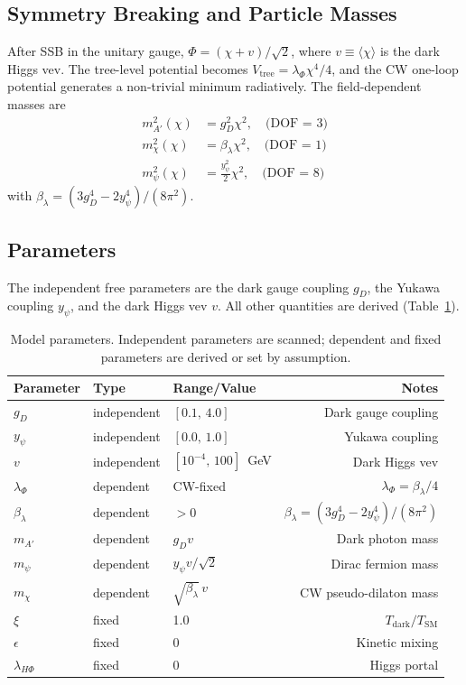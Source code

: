 \documentclass[12pt,a4paper]{article}
\begin{document}
\subsection{Symmetry Breaking and Particle Masses}

After SSB in the unitary gauge, $\Phi = (\chi + v)/\sqrt{2}$, where $v \equiv \langle\chi\rangle$ is the dark Higgs vev. The tree-level potential becomes $V_\text{tree} = \lambda_\Phi \chi^4 / 4$, and the CW one-loop potential generates a non-trivial minimum radiatively. The field-dependent masses are
\begin{align}
m_{A'}^2(\chi) &= g_D^2 \chi^2, \quad \text{(DOF = 3)} \label{eq:mA}\\
m_\chi^2(\chi) &= \beta_\lambda \chi^2, \quad \text{(DOF = 1)} \label{eq:mchi}\\
m_\psi^2(\chi) &= \frac{y_\psi^2}{2} \chi^2, \quad \text{(DOF = 8)} \label{eq:mpsi}
\end{align}
with $\beta_\lambda = (3g_D^4 - 2y_\psi^4)/(8\pi^2)$.

\subsection{Parameters}

The independent free parameters are the dark gauge coupling $g_D$, the Yukawa coupling $y_\psi$, and the dark Higgs vev $v$. All other quantities are derived (Table~\ref{tab:params}).

\begin{table}[H]
\centering
\caption{Model parameters. Independent parameters are scanned; dependent and fixed parameters are derived or set by assumption.}
\label{tab:params}
\begin{tabular}{lllr}
\toprule
Parameter & Type & Range/Value & Notes \\
\midrule
$g_D$ & independent & $[0.1,\,4.0]$ & Dark gauge coupling \\
$y_\psi$ & independent & $[0.0,\,1.0]$ & Yukawa coupling \\
$v$ & independent & $[10^{-4},\,100]$~GeV & Dark Higgs vev \\
\midrule
$\lambda_\Phi$ & dependent & CW-fixed & $\lambda_\Phi = \beta_\lambda/4$ \\
$\beta_\lambda$ & dependent & $>0$ & $\beta_\lambda = (3g_D^4 - 2y_\psi^4)/(8\pi^2)$ \\
$m_{A'}$ & dependent & $g_D v$ & Dark photon mass \\
$m_\psi$ & dependent & $y_\psi v/\sqrt{2}$ & Dirac fermion mass \\
$m_\chi$ & dependent & $\sqrt{\beta_\lambda}\, v$ & CW pseudo-dilaton mass \\
\midrule
$\xi$ & fixed & 1.0 & $T_\text{dark}/T_\text{SM}$ \\
$\epsilon$ & fixed & 0 & Kinetic mixing \\
$\lambda_{H\Phi}$ & fixed & 0 & Higgs portal \\
\bottomrule
\end{tabular}
\end{table}
\end{document}
